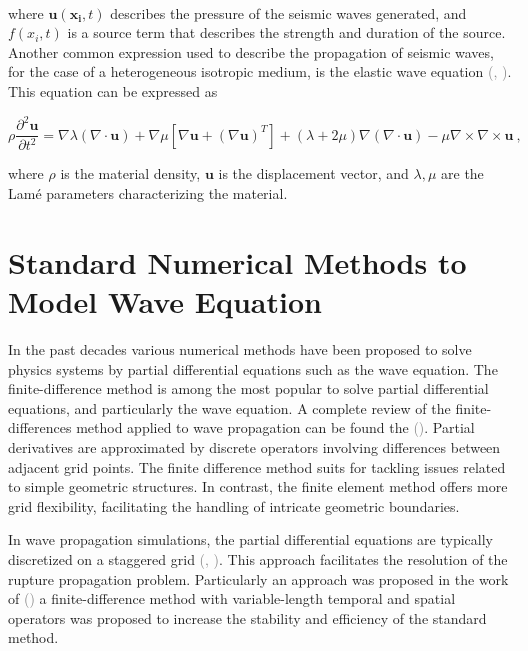 \documentclass{tufte-handout}
\renewcommand{\citep}[2][]{\textcolor{gray}{(\citeauthor{#2}, \citeyear[#1]{#2})}}
\renewcommand{\citeauthoryear}[2][]{\textcolor{gray}{\citeauthor{#2} (\textcolor{gray}{\citeyear[#1]{#2}})}}
\begin{document}
\

where \( \boldsymbol{u}(\boldsymbol{x_i}, t) \) describes the pressure of the seismic waves generated, and \( f(x_i, t) \) is a source term that describes the strength and duration of the source. Another common expression used to describe the propagation of seismic waves, for the case of a heterogeneous isotropic medium, is the elastic wave equation \citep{moseley_fast_2018,lehmann_fourier_2023}. This equation can be expressed as 

\begin{equation}
\rho \frac{\partial^2 \boldsymbol{u}}{\partial t^2} = \nabla \lambda (\nabla \cdot \boldsymbol{u}) + \nabla \mu \left[\nabla \boldsymbol{u} + (\nabla \boldsymbol{u})^T\right] + (\lambda + 2\mu) \nabla (\nabla \cdot \boldsymbol{u}) - \mu \nabla \times \nabla \times \boldsymbol{u} \ ,
\label{elastic}
\end{equation}

where $\rho$ is the material density, $\boldsymbol{u}$ is the displacement vector, and $\lambda, \mu$ are the Lamé parameters characterizing the material.


\section{Standard Numerical Methods to Model Wave Equation}\label{sec:tnm}

In the past decades various numerical methods have been proposed to solve physics systems by partial differential equations such as the wave equation. The finite-difference method is among the most popular to solve partial differential equations, and particularly the wave equation. A complete review of the finite-differences method applied to wave propagation can be found the \citeauthoryear{Moczo2014}. Partial derivatives are approximated by discrete operators involving differences between adjacent grid points. The finite difference method suits for tackling issues related to simple geometric structures. In contrast, the finite element method offers more grid flexibility, facilitating the handling of intricate geometric boundaries.

In wave propagation simulations, the partial differential equations are typically discretized on a staggered grid \citep{madariaga_dynamics_1976,Virieux1986}. This approach facilitates the resolution of the rupture propagation problem. Particularly an approach was proposed in the work of \citeauthoryear{Zhou2021} a finite-difference method with variable-length temporal and spatial operators was proposed to increase the stability and efficiency of the standard method.
\end{document}
